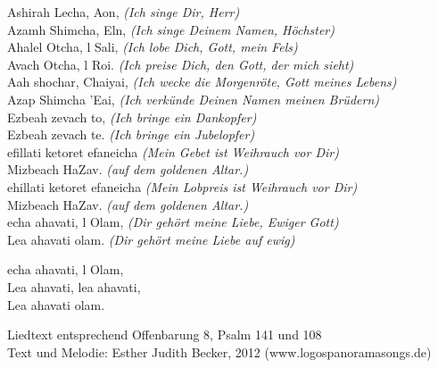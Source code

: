 \begin{tabbing}
Ashirah Lecha, Aon,\hspace{30px} \=  \textit{(Ich singe Dir, Herr)}\\
Azamh Shimcha, Eln,\> \textit{(Ich singe Deinem Namen, Höchster)}\\
Ahalel Otcha, l Sali, \> \textit{(Ich lobe Dich, Gott, mein Fels)}\\
Avach Otcha, l Roi. \> \textit{(Ich preise Dich, den Gott, der mich sieht)}\\

Aah shochar,  Chaiyai,\> \textit{(Ich wecke die Morgenröte, Gott meines Lebens)}\\
Azap Shimcha 'Eai, \> \textit{(Ich verkünde Deinen Namen meinen Brüdern)}\\
Ezbeah zevach to, \> \textit{(Ich bringe ein Dankopfer)}\\
Ezbeah zevach te. \> \textit{(Ich bringe ein Jubelopfer)}\\

efillati ketoret efaneicha \> \textit{(Mein Gebet ist Weihrauch vor Dir)}\\
 Mizbeach HaZav. \> \textit{(auf dem goldenen Altar.)}\\
ehillati ketoret efaneicha  \> \textit{(Mein Lobpreis ist Weihrauch vor Dir)}\\
 Mizbeach HaZav. \> \textit{(auf dem goldenen Altar.)}\\
 

echa ahavati, l Olam, \>  \textit{(Dir gehört meine Liebe, Ewiger Gott)}\\
Lea ahavati  olam. \>  \textit{(Dir gehört meine Liebe auf ewig)}
\end{tabbing}

echa ahavati, l Olam,\\ 
Lea ahavati, lea ahavati,\\
Lea ahavati  olam.\\

\begin{footnotesize}
Liedtext entsprechend Offenbarung 8, Psalm 141 und 108\\
Text und Melodie: Esther Judith Becker, 2012 (www.logospanoramasongs.de)
\end{footnotesize}